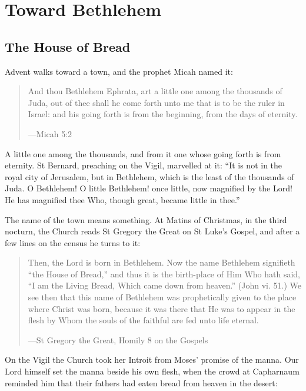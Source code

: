 \section{Toward Bethlehem}

\subsection{The House of Bread}\label{sec:bread}

Advent walks toward a town, and the prophet Micah named it:

\begin{quote}
And thou Bethlehem Ephrata, art a little one among the thousands of Juda, out
of thee shall he come forth unto me that is to be the ruler in Israel: and his
going forth is from the beginning, from the days of eternity.\par
{\smallskip\noindent\small ---Micah 5:2\par}
\end{quote}

A little one among the thousands, and from it one whose going forth is from
eternity. St Bernard, preaching on the Vigil, marvelled at it: ``It is not
in the royal city of Jerusalem, but in Bethlehem, which is the least of the
thousands of Juda. O Bethlehem! O little Bethlehem! once little, now magnified
by the Lord! He has magnified thee Who, though great, became little in thee.''

The name of the town means something. At Matins of Christmas, in the third nocturn,
the Church reads St Gregory the Great on St Luke's Gospel, and after a few lines
on the census he turns to it:

\begin{quote}
Then, the Lord is born in Bethlehem. Now the name Bethlehem signifieth ``the
House of Bread,'' and thus it is the birth-place of Him Who hath said, ``I am the
Living Bread, Which came down from heaven.'' (John vi. 51.) We see then that this
name of Bethlehem was prophetically given to the place where Christ was born,
because it was there that He was to appear in the flesh by Whom the souls of
the faithful are fed unto life eternal.\par
{\smallskip\noindent\small ---St Gregory the Great, Homily 8 on the Gospels\par}
\end{quote}

On the Vigil the Church took her Introit from Moses' promise of the manna. Our
Lord himself set the manna beside his own flesh, when the crowd at Capharnaum
reminded him that their fathers had eaten bread from heaven in the desert:

